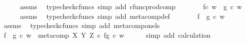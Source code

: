 \begin{isabellebody}
\ \ \ \ \isamarkupfalse%
\ assms\ \isamarkupfalse%
\ {\isacharparenleft}{\kern0pt}typecheck{\isacharunderscore}{\kern0pt}cfuncs{\isacharcomma}{\kern0pt}\ simp\ add{\isacharcolon}{\kern0pt}\ cfunc{\isacharunderscore}{\kern0pt}prod{\isacharunderscore}{\kern0pt}comp{\isacharparenright}{\kern0pt}\isanewline
\ \ \isamarkupfalse%
\ \isamarkupfalse%
\ {\isachardoublequoteopen}{\isachardot}{\kern0pt}{\isachardot}{\kern0pt}{\isachardot}{\kern0pt}\ {\isacharequal}{\kern0pt}\ {\isacharparenleft}{\kern0pt}f{\isasymcirc}\isactrlsub c\ w{\isacharparenright}{\kern0pt}\ {\isasymbox}\ {\isacharparenleft}{\kern0pt}g\ {\isasymcirc}\isactrlsub c\ w{\isacharparenright}{\kern0pt}{\isachardoublequoteclose}\isanewline
\ \ \ \ \isamarkupfalse%
\ assms\ \isamarkupfalse%
\ {\isacharparenleft}{\kern0pt}typecheck{\isacharunderscore}{\kern0pt}cfuncs{\isacharcomma}{\kern0pt}\ simp\ add{\isacharcolon}{\kern0pt}\ meta{\isacharunderscore}{\kern0pt}comp{}{\isacharunderscore}{\kern0pt}def{}{\isacharparenright}{\kern0pt}\isanewline
\ \ \isamarkupfalse%
\ \isamarkupfalse%
\ {\isachardoublequoteopen}{\isachardot}{\kern0pt}{\isachardot}{\kern0pt}{\isachardot}{\kern0pt}\ {\isacharequal}{\kern0pt}\ {\isacharparenleft}{\kern0pt}f\ {\isasymbox}\ g{\isacharparenright}{\kern0pt}\ {\isasymcirc}\isactrlsub c\ w{\isachardoublequoteclose}\isanewline
\ \ \ \ \isamarkupfalse%
\ assms\ \isamarkupfalse%
\ {\isacharparenleft}{\kern0pt}typecheck{\isacharunderscore}{\kern0pt}cfuncs{\isacharcomma}{\kern0pt}\ simp\ add{\isacharcolon}{\kern0pt}\ meta{\isacharunderscore}{\kern0pt}comp{\isacharunderscore}{\kern0pt}on{\isacharunderscore}{\kern0pt}els{\isacharparenright}{\kern0pt}\isanewline
\ \ \isamarkupfalse%
\ \isamarkupfalse%
\ {\isachardoublequoteopen}{\isacharparenleft}{\kern0pt}f\ {\isasymbox}\ g{\isacharparenright}{\kern0pt}\ {\isasymcirc}\isactrlsub c\ w\ {\isacharequal}{\kern0pt}\ {\isacharparenleft}{\kern0pt}meta{\isacharunderscore}{\kern0pt}comp\ X\ Y\ Z\ {\isasymcirc}\isactrlsub c\ {\isasymlangle}f{\isacharcomma}{\kern0pt}g{\isasymrangle}{\isacharparenright}{\kern0pt}\ {\isasymcirc}\isactrlsub c\ w{\isachardoublequoteclose}\isanewline
\ \ \ \ \isamarkupfalse%
\ {\isacharparenleft}{\kern0pt}simp\ add{\isacharcolon}{\kern0pt}\ calculation{\isacharparenright}{\kern0pt}\isanewline
{}\isamarkupfalse%
%
\endisatagproof
{\isafoldproof}%
%
\isadelimproof
\isanewline

\end{isabellebody}
